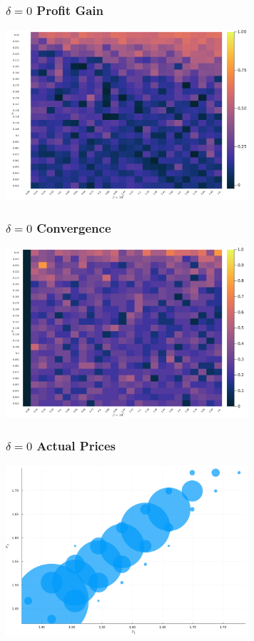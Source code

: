 \documentclass{beamer}
\begin{document}
	
	\begin{frame}\frametitle{$\delta=0$ Profit Gain}
\begin{center}
	\includegraphics[width=9cm]{heatmap_profit_gain_small_main_delta_0.0.png}
\end{center}
\end{frame}
\begin{frame}\frametitle{$\delta=0$ Convergence}
\begin{center}
	\includegraphics[width=9cm]{heatmap_convergence_counts_small_main_delta_0.0.png}
\end{center}
\end{frame}
\begin{frame}\frametitle{$\delta=0$ Actual Prices}
\begin{center}
	\includegraphics[width=9cm]{scatter_plot_prices_small_main_delta_0.0.png}
\end{center}
\end{frame}
\end{document}
